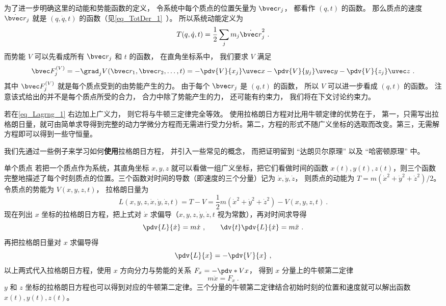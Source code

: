 为了进一步明确这里的动能和势能函数的定义， 令系统中每个质点的位置矢量为 $\bvec r_j$， 都看作 $(q, t)$ 的函数。 那么质点的速度 $\dot{\bvec r}_j$ 就是 $(q,\dot q, t)$ 的函数（见\autoref{eq_TotDer_1}~）。 所以系统动能定义为
\begin{equation}
T(q, \dot q, t) = \frac{1}{2}\sum_j m_j\dot {\bvec r}_j^2~.
\end{equation}
而势能 $V$ 可以先看成所有 $\bvec r_j$ 和 $t$ 的函数， 在直角坐标系中， 我们要求 $V$ 满足
\begin{equation}
\bvec F_j^{(V)} = - \grad_j V(\bvec r_1,\bvec r_2, \dots, t) = -\pdv{V}{x_j}\uvec x - \pdv{V}{y_j}\uvec y - \pdv{V}{z_j} \uvec z~.
\end{equation}
其中 $\bvec F_j^{(V)}$ 就是每个质点受到的由势能产生的力。 由于每个 $\bvec r_j$ 是 $(q, t)$ 的函数， 所以 $V$ 可以进一步看成 $(q, t)$ 的函数。 注意该式给出的并不是每个质点所受的合力， 合力中除了势能产生的力， 还可能有约束力， 我们将在下文讨论约束力。

若在\autoref{eq_Lagrng_1} 右边加上\enref{}{}广义力， 则它将与牛顿三定律完全等效。 使用拉格朗日方程对比用牛顿定律的优势在于， 第一，只需写出拉格朗日量，就可由简单求导得到完整的动力学微分方程而无需进行受力分析。第二，方程的形式不随广义坐标的选取而改变。第三，无需解方程即可以得到一些守恒量。

我们先通过一些例子来学习如何\textbf{使用}拉格朗日方程， 并引入一些常见的概念， 而把证明留到 “达朗贝尔原理” 以及 “哈密顿原理” 中。

\begin{example}{单个质点}\label{ex_Lagrng_1}
若把一个质点作为系统，其直角坐标 $x,y,z$ 就可以看做一组广义坐标，把它们看做时间的函数 $x(t), y(t), z(t)$，则三个函数完整地描述了每个时刻质点的位置。三个函数对时间的导数（即速度的三个分量）记为 $\dot x, \dot y, \dot z$， 则质点的动能为 $T=m(\dot x^2+\dot y^2+\dot z^2)/2$。 令质点的势能为 $V(x,y,z,t)$， 拉格朗日量为
\begin{equation}
L(x,y,z, \dot x, \dot y, \dot z, t) = T-V = \frac12 m(\dot x^2+\dot y^2+\dot z^2) - V(x,y,z,t)~.
\end{equation}
现在列出 $x$ 坐标的拉格朗日方程，把上式对 $\dot x$ 求偏导（$x, y,z, \dot y, \dot z, t$ 视为常数），再对时间求导得
\begin{equation}
\pdv{L}{\dot x} = m\dot x~,
\qquad
\dv{t} \pdv{L}{\dot x} = m\ddot x~.
\end{equation}
再把拉格朗日量对 $x$ 求偏导得
\begin{equation}
\pdv{L}{x} = -\pdv{V}{x}~,
\end{equation}
以上两式代入拉格朗日方程，使用 $x$ 方向分力与势能的关系 $F_x = -\pdv*{V}{x}$， 得到 $x$ 分量上的牛顿第二定律
\begin{equation}
m\ddot x = F_x~.
\end{equation}
$y$ 和 $z$ 坐标的拉格朗日方程也可以得到对应的牛顿第二定律。三个分量的牛顿第二定律结合初始时刻的位置和速度就可以解出函数 $x(t), y(t), z(t)$。 
\end{example}

